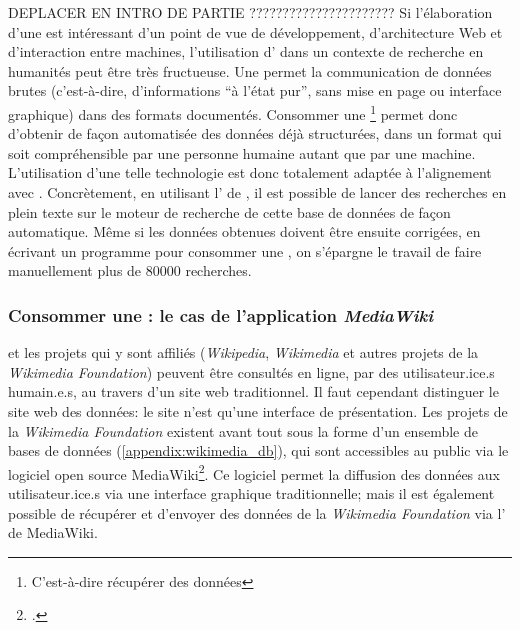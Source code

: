 DEPLACER EN INTRO DE PARTIE ??????????????????????
Si l'élaboration d'une \api{} est intéressant d'un point de vue de développement, d'architecture Web et d'interaction entre machines, l'utilisation d'\api{} dans un contexte de recherche en humanités peut être très fructueuse. Une \api{} permet la communication de données brutes (c'est-à-dire, d'informations \enquote{à l'état pur}, sans mise en page ou interface graphique) dans des formats documentés. Consommer une \api{}\footnote{C'est-à-dire récupérer des données} permet donc d'obtenir de façon automatisée des données déjà structurées, dans un format qui soit compréhensible par une personne humaine autant que par une machine. L'utilisation d'une telle technologie est donc totalement adaptée à l'alignement avec \wkd{}. Concrètement, en utilisant l'\api{} de \wkd{}, il est possible de lancer des recherches en plein texte sur le moteur de recherche de cette base de données de façon automatique. Même si les données obtenues doivent être ensuite corrigées, en écrivant un programme pour consommer une \api{}, on s'épargne le travail de faire manuellement plus de 80000 recherches.

\subsubsection{Consommer une \api{}: le cas de l'application \textit{MediaWiki}}
\wkd{} et les projets qui y sont affiliés (\textit{Wikipedia}, \textit{Wikimedia} et autres projets de la \textit{Wikimedia Foundation}) peuvent être consultés en ligne, par des utilisateur.ice.s humain.e.s, au travers d'un site web traditionnel. Il faut cependant distinguer le site web des données: le site n'est qu'une interface de présentation. Les projets de la \textit{Wikimedia Foundation} existent avant tout sous la forme d'un ensemble de bases de données (\ref{appendix:wikimedia_db}), qui sont accessibles au public via le logiciel \gls{open source} MediaWiki\footcite{noauthor_wikimedia_2022}. Ce logiciel permet la diffusion des données aux utilisateur.ice.s via une interface graphique traditionnelle; mais il est également possible de récupérer et d'envoyer des données de la \textit{Wikimedia Foundation} via l'\api{} de MediaWiki.

